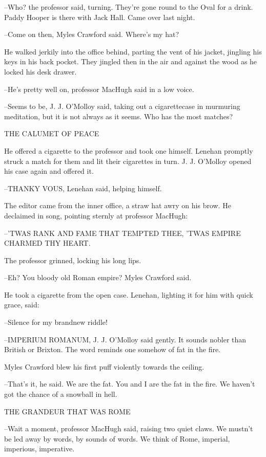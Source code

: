 --Who? the professor said, turning. They're gone round to the Oval for a
drink. Paddy Hooper is there with Jack Hall. Came over last night.

--Come on then, Myles Crawford said. Where's my hat?

He walked jerkily into the office behind, parting the vent of his jacket,
jingling his keys in his back pocket. They jingled then in the air and
against the wood as he locked his desk drawer.

--He's pretty well on, professor MacHugh said in a low voice.

--Seems to be, J. J. O'Molloy said, taking out a cigarettecase in
murmuring meditation, but it is not always as it seems. Who has the most
matches?


    THE CALUMET OF PEACE


He offered a cigarette to the professor and took one himself. Lenehan
promptly struck a match for them and lit their cigarettes in turn. J. J.
O'Molloy opened his case again and offered it.

--THANKY VOUS, Lenehan said, helping himself.

The editor came from the inner office, a straw hat awry on his brow.
He declaimed in song, pointing sternly at professor MacHugh:


  --'TWAS RANK AND FAME THAT TEMPTED THEE,
    'TWAS EMPIRE CHARMED THY HEART.


The professor grinned, locking his long lips.

--Eh? You bloody old Roman empire? Myles Crawford said.

He took a cigarette from the open case. Lenehan, lighting it for him
with quick grace, said:

--Silence for my brandnew riddle!

--IMPERIUM ROMANUM, J. J. O'Molloy said gently. It sounds nobler than
British or Brixton. The word reminds one somehow of fat in the fire.

Myles Crawford blew his first puff violently towards the ceiling.

--That's it, he said. We are the fat. You and I are the fat in the fire.
We haven't got the chance of a snowball in hell.


    THE GRANDEUR THAT WAS ROME


--Wait a moment, professor MacHugh said, raising two quiet claws. We
mustn't be led away by words, by sounds of words. We think of Rome,
imperial, imperious, imperative.

